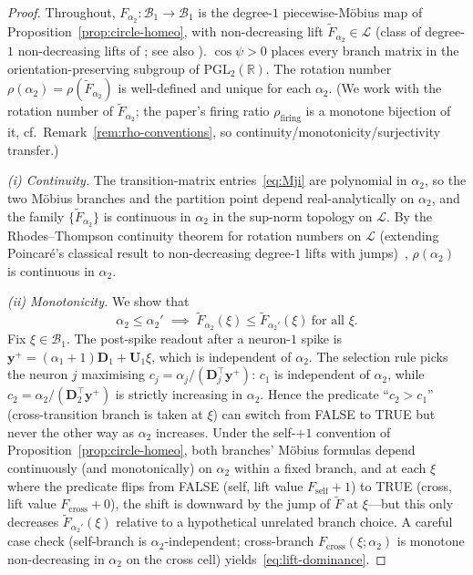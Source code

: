 \documentclass[12pt]{article}
\newcommand{\vv}[1]{\mathbf{#1}}
\newcommand{\DD}{\vv{D}}
\newcommand{\yy}{\vv{y}}
\newcommand{\RR}{\mathbb{R}}
\newcommand{\Bsp}{\mathcal{B}}
\begin{document}
\begin{proof}
Throughout, $F_{\alpha_2}:\Bsp_1\to\Bsp_1$ is the degree-$1$ piecewise-M\"obius map of Proposition~\ref{prop:circle-homeo}, with non-decreasing lift $\widetilde F_{\alpha_2}\in\mathcal{L}$ (class of degree-$1$ non-decreasing lifts of \citealp{rhodes1991topologies}; see also \citealp[Ch.~3]{alseda2000combinatorial}). $\cos\psi>0$ places every branch matrix in the orientation-preserving subgroup of $\mathrm{PGL}_2(\RR)$. The rotation number $\rho(\alpha_2)=\rho(\widetilde F_{\alpha_2})$ is well-defined and unique for each $\alpha_2$. (We work with the rotation number of $\widetilde F_{\alpha_2}$; the paper's firing ratio $\rho_{\text{firing}}$ is a monotone bijection of it, cf.~Remark~\ref{rem:rho-conventions}, so continuity/monotonicity/surjectivity transfer.)

\emph{(i) Continuity.} The transition-matrix entries~\eqref{eq:Mji} are polynomial in $\alpha_2$, so the two M\"obius branches and the partition point depend real-analytically on $\alpha_2$, and the family $\{\widetilde F_{\alpha_2}\}$ is continuous in $\alpha_2$ in the sup-norm topology on $\mathcal{L}$. By the Rhodes--Thompson continuity theorem for rotation numbers on $\mathcal{L}$ (extending Poincar\'e's classical result to non-decreasing degree-$1$ lifts with jumps)~\citep{rhodes1991topologies,alseda2000combinatorial,poincare1885courbes,herman1979conjugaison}, $\rho(\alpha_2)$ is continuous in $\alpha_2$.

\emph{(ii) Monotonicity.} We show that
\begin{equation}
    \alpha_2 \leq \alpha_2' \;\implies\; \widetilde F_{\alpha_2}(\xi) \leq \widetilde F_{\alpha_2'}(\xi)\ \text{for all $\xi$.}
    \label{eq:lift-dominance}
\end{equation}
Fix $\xi\in\Bsp_1$. The post-spike readout after a neuron-$1$ spike is $\yy^+ = (\alpha_1{+}1)\DD_1 + \vv{U}_1\xi$, which is independent of $\alpha_2$. The selection rule picks the neuron $j$ maximising $c_j=\alpha_j/(\DD_j^\top\yy^+)$: $c_1$ is independent of $\alpha_2$, while $c_2=\alpha_2/(\DD_2^\top\yy^+)$ is strictly increasing in $\alpha_2$. Hence the predicate ``$c_2>c_1$'' (cross-transition branch is taken at $\xi$) can switch from FALSE to TRUE but never the other way as $\alpha_2$ increases. Under the self-$+1$ convention of Proposition~\ref{prop:circle-homeo}, both branches' M\"obius formulas depend continuously (and monotonically) on $\alpha_2$ within a fixed branch, and at each $\xi$ where the predicate flips from FALSE (self, lift value $F_{\text{self}}+1$) to TRUE (cross, lift value $F_{\text{cross}}+0$), the shift is downward by the jump of $\widetilde F$ at $\xi$—but this only decreases $\widetilde F_{\alpha_2'}(\xi)$ relative to a hypothetical unrelated branch choice. A careful case check (self-branch is $\alpha_2$-independent; cross-branch $F_{\text{cross}}(\xi;\alpha_2)$ is monotone non-decreasing in $\alpha_2$ on the cross cell) yields~\eqref{eq:lift-dominance}.


\end{proof}
\end{document}
